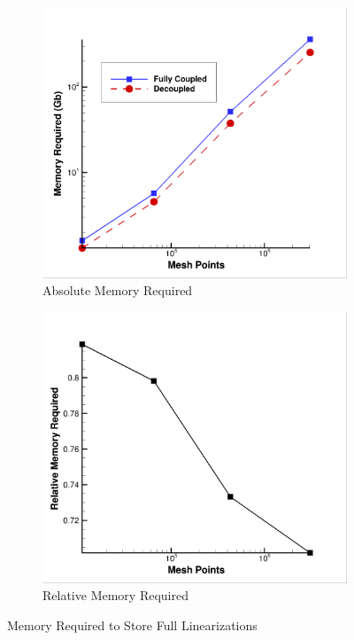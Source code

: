 \begin{figure}[h]
  \centering
	\begin{subfigure}[b]{0.45\textwidth}
    \centering
    \includegraphics[width=\textwidth]{figures/adj-efficiency/mem-req-srp.png}
    \caption{Absolute Memory Required}
    \label{fig:abs-mem-req}
  \end{subfigure}
	\begin{subfigure}[b]{0.45\textwidth}
    \centering
    \includegraphics[width=\textwidth]{figures/adj-efficiency/mem-rel-savings.png}
    \caption{Relative Memory Required}
    \label{fig:relative-mem-req}
  \end{subfigure}
  \caption{Memory Required to Store Full Linearizations}
  \label{fig:srp-mem-req}
\end{figure}
